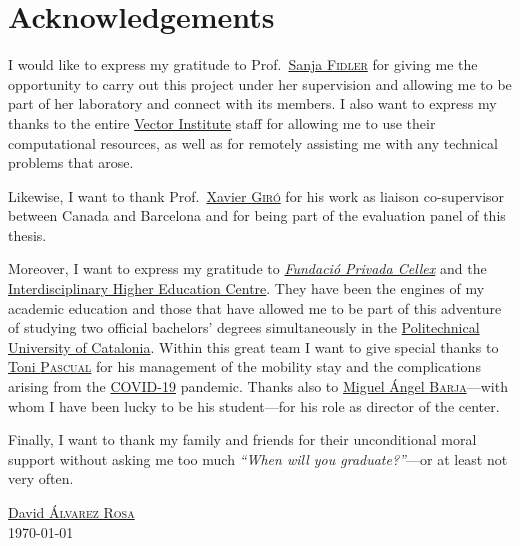 \chapter*{Acknowledgements}


I would like to express my gratitude to Prof.\
\href{https://www.cs.utoronto.ca/~fidler/}{Sanja \textsc{Fidler}} for giving me
the opportunity to carry out this project under her supervision and allowing me
to be part of her laboratory and connect with its members. I also want to
express my thanks to the entire \href{https://vectorinstitute.ai/}{Vector
  Institute} staff for allowing me to use their computational resources, as
well as for remotely assisting me with any technical problems that arose.

Likewise, I want to thank Prof.\
\href{https://imatge.upc.edu/web/people/xavier-giro}{Xavier \textsc{Giró}} for
his work as liaison co-supervisor between Canada and Barcelona and for being
part of the evaluation panel of this thesis.

Moreover, I want to express my gratitude to
\href{http://cellex-mpq.icfo.eu/about_2/}{\itshape Fundació Privada Cellex} and
the \href{https://cfis.upc.edu/en}{Interdisciplinary Higher Education
  Centre}. They have been the engines of my academic education and those that
have allowed me to be part of this adventure of studying two official
bachelors' degrees simultaneously in the
\href{https://www.upc.edu/en}{Politechnical University of Catalonia}. Within
this great team I want to give special thanks to
\href{https://spcom.upc.edu/en/people/antonio-pascual-iserte}{Toni
  \textsc{Pascual}} for his management of the mobility stay and the
complications arising from the
\href{https://en.wikipedia.org/wiki/Covid-19}{COVID-19} pandemic. Thanks also
to \href{https://mat.upc.edu/en/people/miguel.angel.barja}{Miguel Ángel
  \textsc{Barja}}---with whom I have been lucky to be his student---for his
role as director of the center.

Finally, I want to thank my family and friends for their unconditional moral
support without asking me too much \textit{``When will you graduate?''}---or at
least not very often.

\begin{flushright}
  \href{https://david.alvarezrosa.com/}{David \textsc{Álvarez Rosa}}\\
  \today
\end{flushright}

\begin{center}
\end{center}



